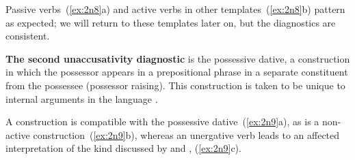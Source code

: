 \begin{exe}
\begin{xlist}
\begin{exe}
\begin{xlist}
\begin{exe}
\begin{xlist}
\begin{exe}
\begin{exe}
\begin{xlist}
\begin{exe}
\begin{xlist}
 \begin{exe}
 \ex  \label{ex:2n7}
 \begin{xlist} 
	
	
 \z
\z 

Passive verbs~(\ref{ex:2n8}a) and active verbs in other templates~(\ref{ex:2n8}b) pattern as expected; we will return to these templates later on, but the diagnostics are consistent.
 \begin{exe}
 \ex  \label{ex:2n8}
 \begin{xlist} 
	
	
 \z
\z 

\textbf{The second unaccusativity diagnostic} is the possessive dative, a construction in which the possessor appears in a prepositional phrase in a separate constituent from the possessee (possessor raising). This construction is taken to be unique to internal arguments in the language \citep{borergrodzinsky86,borer98csli}.

A  construction is compatible with the possessive dative~(\ref{ex:2n9}a), as is a non-active construction~(\ref{ex:2n9}b), whereas an unergative verb leads to an affected interpretation of the kind discussed by \cite{arieletal15} and \cite{barashersiegalboneh16}, (\ref{ex:2n9}c). 


\end{xlist}
\end{exe}
\end{xlist}
\end{exe}
\end{xlist}
\end{exe}
\end{xlist}
\end{exe}
\end{exe}
\end{xlist}
\end{exe}
\end{xlist}
\end{exe}
\end{xlist}
\end{exe}
